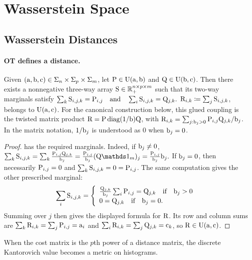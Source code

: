 \section{Wasserstein Space}
\label{sec-wasserstein-space}
\subsection{Wasserstein Distances}
\label{sec-wasserstein-distances}
\paragraph{OT defines a distance.}
\begin{lem}\label{lem-gluing-discr}
Given $(\a,\b,\VectMode{c}) \in \simplex_n \times \simplex_p \times \simplex_m$,
let $\P \in \CouplingsD(\a,\b)$ and $\Q \in \CouplingsD(\b,\VectMode{c})$. Then there exists a nonnegative three-way array $\S \in \RR_+^{n \times p \times m}$
such that its two-way marginals satisfy
\(\sum_{k} \S_{i,j,k} = \P_{i,j} \qandq \sum_{i} \S_{i,j,k} = \Q_{j,k}.\)
$\R_{i,k}\eqdef\sum_j\S_{i,j,k}$, belongs to
$\CouplingsD(\a,\VectMode{c})$. For the canonical construction below, this
glued coupling is the twisted matrix product
$\R=\P\diag(1/\b)\Q$, with
$\R_{i,k}=\sum_{j:\b_j>0}\P_{i,j}\Q_{j,k}/\b_j$.
In the matrix notation, $1/\b_j$ is understood as $0$ when $\b_j=0$.
\end{lem}
\begin{proof}
has the required marginals. Indeed, if $\b_j \neq 0$, \(\sum_{k} \S_{i,j,k} = \sum_{k} \frac{\P_{i,j} \Q_{j,k}}{\b_j} = \frac{\P_{i,j}}{\b_j}(\Q\ones_m)_j = \frac{\P_{i,j}}{\b_j}\b_j.\)
If $\b_j = 0$, then necessarily $\P_{i,j}=0$ and $\sum_{k} \S_{i,j,k} = 0 = \P_{i,j}$.
The same computation gives the other prescribed marginal:
\[
\sum_i \S_{i,j,k}
=
\choice{
\frac{\Q_{j,k}}{\b_j}\sum_i\P_{i,j}=\Q_{j,k} \qifq \b_j>0\\
0=\Q_{j,k} \qifq \b_j=0.
}
\]
Summing over $j$ then gives the displayed formula for $\R$. Its row and
column sums are $\sum_k\R_{i,k}=\sum_j\P_{i,j}=\a_i$ and
$\sum_i\R_{i,k}=\sum_j\Q_{j,k}=\VectMode{c}_k$, so
$\R\in\CouplingsD(\a,\VectMode{c})$.
\end{proof}
When the cost matrix is the $p$th power of a distance matrix, the discrete Kantorovich value becomes a metric on histograms.

